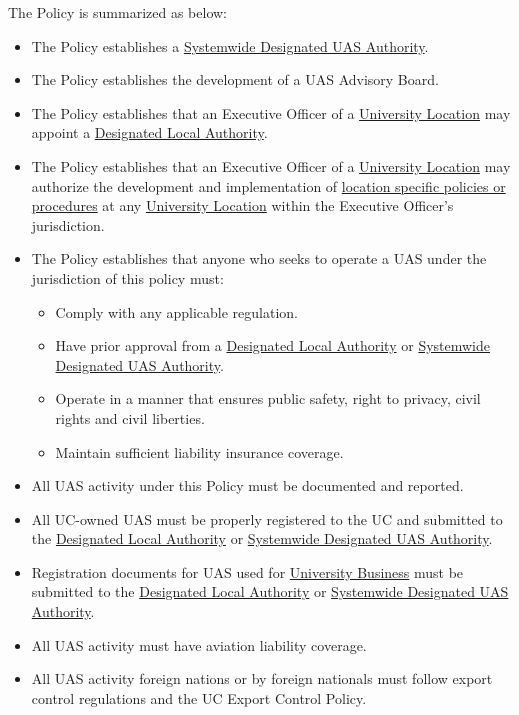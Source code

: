 \documentclass[
]{book}
\providecommand{\tightlist}{%
  \setlength{\itemsep}{0pt}\setlength{\parskip}{0pt}}
\begin{document}
The Policy is summarized as below:

\begin{itemize}
\tightlist
\item
  The Policy establishes a \protect\hyperlink{SDA}{Systemwide Designated UAS Authority}.
\item
  The Policy establishes the development of a UAS Advisory Board.
\item
  The Policy establishes that an Executive Officer of a \protect\hyperlink{UL}{University Location} may appoint a \protect\hyperlink{DLA}{Designated Local Authority}.
\item
  The Policy establishes that an Executive Officer of a \protect\hyperlink{UL}{University Location} may authorize the development and implementation of \protect\hyperlink{LSP}{location specific policies or procedures} at any \protect\hyperlink{UL}{University Location} within the Executive Officer's jurisdiction.
\item
  The Policy establishes that anyone who seeks to operate a UAS under the jurisdiction of this policy must:

  \begin{itemize}
  \tightlist
  \item
    Comply with any applicable regulation.
  \item
    Have prior approval from a \protect\hyperlink{DLA}{Designated Local Authority} or \protect\hyperlink{SDA}{Systemwide Designated UAS Authority}.
  \item
    Operate in a manner that ensures public safety, right to privacy, civil rights and civil liberties.
  \item
    Maintain sufficient liability insurance coverage.
  \end{itemize}
\item
  All UAS activity under this Policy must be documented and reported.
\item
  All UC-owned UAS must be properly registered to the UC and submitted to the \protect\hyperlink{DLA}{Designated Local Authority} or \protect\hyperlink{SDA}{Systemwide Designated UAS Authority}.
\item
  Registration documents for UAS used for \protect\hyperlink{UB}{University Business} must be submitted to the \protect\hyperlink{DLA}{Designated Local Authority} or \protect\hyperlink{SDA}{Systemwide Designated UAS Authority}.
\item
  All UAS activity must have aviation liability coverage.
\item
  All UAS activity foreign nations or by foreign nationals must follow export control regulations and the UC Export Control Policy.
\end{itemize}
\end{document}
